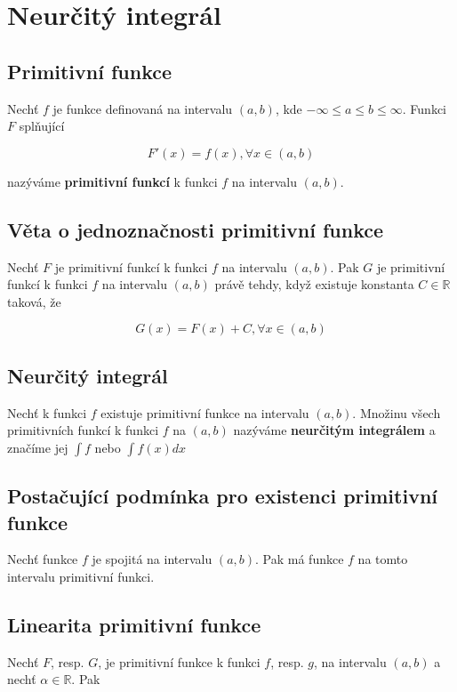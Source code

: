 \section{Neurčitý integrál}

\subsection*{Primitivní funkce}

Nechť $f$ je funkce definovaná na intervalu $(a, b)$, kde $-\infty \leq a \leq
    b \leq \infty$. Funkci $F$ splňující

\[ F'(x) = f(x), \forall  x \in (a, b)\]

\noindent nazýváme \textbf{primitivní funkcí} k funkci $f$ na intervalu $(a, b)$.

\subsection*{Věta o jednoznačnosti primitivní funkce}

Nechť $F$ je primitivní funkcí k funkci $f$ na intervalu $(a, b)$. Pak $G$ je
primitivní funkcí k funkci $f$ na intervalu $(a, b)$ právě tehdy, když existuje
konstanta $C \in \mathds{R}$ taková, že

\[ G(x) = F(x) + C, \forall x \in (a, b)\]

\subsection*{Neurčitý integrál}

Nechť k funkci $f$ existuje primitivní funkce na intervalu $(a, b)$. Množinu
všech primitivních funkcí k funkci $f$ na $(a, b)$ nazýváme \textbf{neurčitým
    integrálem} a značíme jej $\int f$ nebo $\int f(x)dx$

\subsection*{Postačující podmínka pro existenci primitivní funkce}

Nechť funkce $f$ je spojitá na intervalu $(a, b)$. Pak má funkce $f$ na tomto
intervalu primitivní funkci.

\subsection*{Linearita primitivní funkce}

Nechť $F$, resp. $G$, je primitivní funkce k funkci $f$, resp. $g$, na
intervalu $(a, b)$ a nechť $\alpha \in \mathds{R}$. Pak

